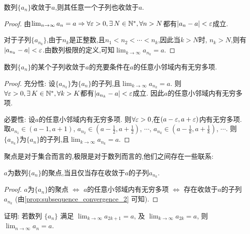 \begin{proposition}
    数列$\{a_n\}$收敛于$a$,则其任意一个子列也收敛于$a$.
\end{proposition}

\begin{proof}
    由$\lim_{n \to \infty} a_n = a \Rightarrow \forall \ve > 0, \exists N \in \mathbb{N}^*, \forall n > N$都有$|a_n - a| < \varepsilon$成立.

    对于子列$\{a_{n_k}\}$,由于$n_k$是正整数,且$n_1 < n_2 < \cdots < n_k$,因此当$k > N$时, $n_k > N$,则有$|a_{n_k} - a| < \varepsilon$.由数列极限的定义,可知$\lim_{k \to \infty} a_{n_k} = a$.
\end{proof}

\begin{proposition}\label{prop:subsequence_convergence_2}
    数列$\{a_n\}$的某个子列收敛于$a$的充要条件在$a$的任意小邻域内有无穷多项.
\end{proposition}

\begin{proof}
    充分性: 设$\{a_{n_k}\}$为$\{a_n\}$的子列,且$\lim_{k \to \infty} a_{n_k} = a$. 则$\forall \ve > 0, \exists K \in \mathbb{N}^*, \forall k > K$都有$|a_{n_k} - a| < \varepsilon$成立. 因此$a$的任意小邻域内有无穷多项.

    必要性: 设$a$的任意小邻域内有无穷多项. 则$\forall \varepsilon > 0$,在$(a - \varepsilon, a + \varepsilon)$内有无穷多项. 取$a_{n_1} \in (a - 1, a + 1)$, $a_{n_2} \in \left(a - \frac{1}{2}, a + \frac{1}{2}\right)$, $\cdots$, $a_{n_k} \in \left(a - \frac{1}{k}, a + \frac{1}{k}\right)$, $\cdots$. 则$\{a_{n_k}\}$为$\{a_n\}$的子列,且$\lim_{k \to \infty} a_{n_k} = a$.
\end{proof}

聚点是对于集合而言的,极限是对于数列而言的,他们之间存在一些联系:
\begin{proposition}
    $a$为数列$\{a_n\}$的聚点,当且仅当存在收敛于$a$的子列${a_{n_k}}$.
\end{proposition}

\begin{proof}
    $a$为$\{a_n\}$的聚点 $\Leftrightarrow$ $a$的任意小邻域内有无穷多项 $\Leftrightarrow$ 存在收敛于$a$的子列${a_{n_k}}$ (由\autoref{prop:subsequence_convergence_2} 可知).
\end{proof}

\begin{exercise}[1.2.6]
    证明: 若数列 $\{a_n\}$ 满足 $\lim_{k\to\infty} a_{2k+1} = a$, 及 $\lim_{k\to\infty} a_{2k} = a$, 则 $\lim_{n\to\infty} a_n = a$.
\end{exercise}


